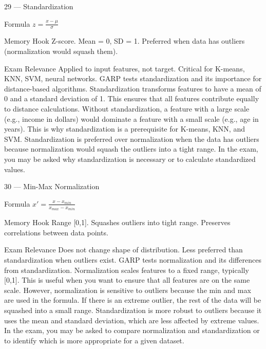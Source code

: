 \documentclass[aspectratio=169,8pt]{beamer}
\begin{document}
	\begin{frame}{29 --- Standardization}
		\begin{block}{Formula}
			$z = \frac{x - \mu}{\sigma}$
		\end{block}
		\begin{block}{Memory Hook}
			Z-score. Mean = 0, SD = 1. Preferred when data has outliers (normalization would squash them).
		\end{block}
		\begin{block}{Exam Relevance}
			Applied to input features, not target. Critical for K-means, KNN, SVM, neural networks. GARP tests standardization and its importance for distance-based algorithms. Standardization transforms features to have a mean of 0 and a standard deviation of 1. This ensures that all features contribute equally to distance calculations. Without standardization, a feature with a large scale (e.g., income in dollars) would dominate a feature with a small scale (e.g., age in years). This is why standardization is a prerequisite for K-means, KNN, and SVM. Standardization is preferred over normalization when the data has outliers because normalization would squash the outliers into a tight range. In the exam, you may be asked why standardization is necessary or to calculate standardized values.
		\end{block}
	\end{frame}
	
	\begin{frame}{30 --- Min-Max Normalization}
		\begin{block}{Formula}
			$x' = \frac{x - x_{min}}{x_{max} - x_{min}}$
		\end{block}
		\begin{block}{Memory Hook}
			Range [0,1]. Squashes outliers into tight range. Preserves correlations between data points.
		\end{block}
		\begin{block}{Exam Relevance}
			Does not change shape of distribution. Less preferred than standardization when outliers exist. GARP tests normalization and its differences from standardization. Normalization scales features to a fixed range, typically [0,1]. This is useful when you want to ensure that all features are on the same scale. However, normalization is sensitive to outliers because the min and max are used in the formula. If there is an extreme outlier, the rest of the data will be squashed into a small range. Standardization is more robust to outliers because it uses the mean and standard deviation, which are less affected by extreme values. In the exam, you may be asked to compare normalization and standardization or to identify which is more appropriate for a given dataset.
		\end{block}
	\end{frame}
	
\end{document}
